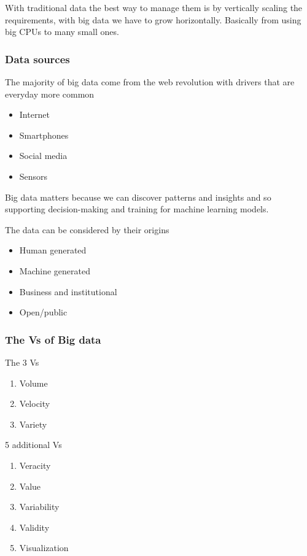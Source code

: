 With traditional data the best way to manage them is by vertically scaling the requirements, with big data we have to grow horizontally. Basically from using big CPUs to many small ones. 

\subsubsection{Data sources}

The majority of big data come from the web revolution with drivers that are everyday more common

\begin{itemize}
    \item Internet
    \item Smartphones
    \item Social media
    \item Sensors
\end{itemize}

Big data matters because we can discover patterns and insights and so supporting decision-making and training for machine learning models.

\vspace{10pt}

The data can be considered by their origins

\begin{itemize}
    \item Human generated
    \item Machine generated
    \item Business and institutional
    \item Open/public
\end{itemize}

\subsubsection{The Vs of Big data}

The 3 Vs

\begin{enumerate}
    \item Volume
    \item Velocity 
    \item Variety 
\end{enumerate}

5 additional Vs
\begin{enumerate}
    \item Veracity
    \item Value
    \item Variability
    \item Validity
    \item Visualization
\end{enumerate}

